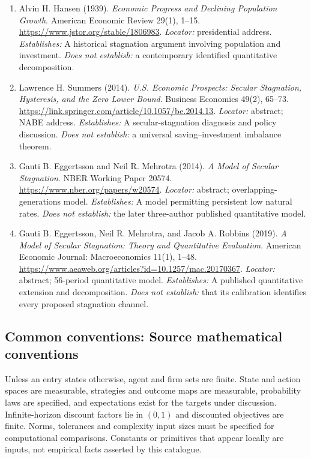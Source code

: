 \documentclass[11pt,a4paper]{article}
\begin{document}
\begin{enumerate}

\item[S1] Alvin H. Hansen (1939). \emph{Economic Progress and Declining Population Growth}. American Economic Review 29(1), 1--15. \url{https://www.jstor.org/stable/1806983}. \textit{Locator:} presidential address. \textit{Establishes:} A historical stagnation argument involving population and investment. \textit{Does not establish:} a contemporary identified quantitative decomposition.

\item[S2] Lawrence H. Summers (2014). \emph{U.S. Economic Prospects: Secular Stagnation, Hysteresis, and the Zero Lower Bound}. Business Economics 49(2), 65--73. \url{https://link.springer.com/article/10.1057/be.2014.13}. \textit{Locator:} abstract; NABE address. \textit{Establishes:} A secular-stagnation diagnosis and policy discussion. \textit{Does not establish:} a universal saving--investment imbalance theorem.

\item[S3] Gauti B. Eggertsson and Neil R. Mehrotra (2014). \emph{A Model of Secular Stagnation}. NBER Working Paper 20574. \url{https://www.nber.org/papers/w20574}. \textit{Locator:} abstract; overlapping-generations model. \textit{Establishes:} A model permitting persistent low natural rates. \textit{Does not establish:} the later three-author published quantitative model.

\item[S4] Gauti B. Eggertsson, Neil R. Mehrotra, and Jacob A. Robbins (2019). \emph{A Model of Secular Stagnation: Theory and Quantitative Evaluation}. American Economic Journal: Macroeconomics 11(1), 1--48. \url{https://www.aeaweb.org/articles?id=10.1257/mac.20170367}. \textit{Locator:} abstract; 56-period quantitative model. \textit{Establishes:} A published quantitative extension and decomposition. \textit{Does not establish:} that its calibration identifies every proposed stagnation channel.

\end{enumerate}

\subsection*{Common conventions: Source mathematical conventions}

Unless an entry states otherwise, agent and firm sets are finite. State and action spaces are measurable, strategies and outcome maps are measurable, probability laws are specified, and expectations exist for the targets under discussion. Infinite-horizon discount factors lie in $(0,1)$ and discounted objectives are finite. Norms, tolerances and complexity input sizes must be specified for computational comparisons. Constants or primitives that appear locally are inputs, not empirical facts asserted by this catalogue.
\end{document}
